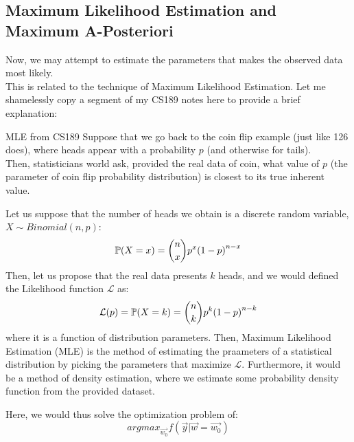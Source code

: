 \subsection{Maximum Likelihood Estimation and Maximum A-Posteriori}
Now, we may attempt to estimate the parameters that makes the observed data most likely. \\
This is related to the technique of Maximum Likelihood Estimation. Let me shamelessly copy a segment of my CS189 notes here to provide a brief explanation:
\begin{ln-explain}{MLE from CS189}{}
    Suppose that we go back to the coin flip example (just like 126 does), where heads appear with a probability $p$ (and otherwise for tails). \\
    Then, statisticians world ask, provided the real data of coin, what value of $p$ (the parameter of coin flip probability distribution) is closest to its true inherent value.

    Let us suppose that the number of heads we obtain is a discrete random variable, $X \sim Binomial(n, p)$:
    \[
        \P(X = x) = \binom{n}{x} p^x {(1 - p)}^{n - x}
    \]
    Then, let us propose that the real data presents $k$ heads, and we would defined the Likelihood function $\mathcal{L}$ as:
    \[
        \mathcal{L}(p) = \P(X = k) = \binom{n}{k} p^k {(1 - p)}^{n - k}
    \]
    where it is a function of distribution parameters.
    Then, Maximum Likelihood Estimation (MLE) is the method of estimating the praameters of a statistical distribution by picking the parameters that maximize $\mathcal{L}$.
    Furthermore, it would be a method of density estimation, where we estimate some probability density function from the provided dataset.
\end{ln-explain}
Here, we would thus solve the optimization problem of:
\[
    {argmax}_{\vec{w_0}} f (\vec{y} | \vec{w} = \vec{w_0})
\]
